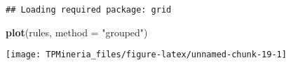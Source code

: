 \documentclass[runningheads,a4paper]{llncs}
\newenvironment{Shaded}{}{}
\newcommand{\KeywordTok}[1]{\textcolor[rgb]{0.00,0.44,0.13}{\textbf{{#1}}}}
\newcommand{\DataTypeTok}[1]{\textcolor[rgb]{0.56,0.13,0.00}{{#1}}}
\newcommand{\StringTok}[1]{\textcolor[rgb]{0.25,0.44,0.63}{{#1}}}
\newcommand{\NormalTok}[1]{{#1}}
\begin{document}
\begin{verbatim}
## Loading required package: grid
\end{verbatim}

\begin{Shaded}
\begin{Highlighting}[]
\KeywordTok{plot}\NormalTok{(rules, }\DataTypeTok{method =} \StringTok{"grouped"}\NormalTok{)}
\end{Highlighting}
\end{Shaded}

\texttt{[image: TPMineria\_files/figure-latex/unnamed-chunk-19-1]}
\end{document}
